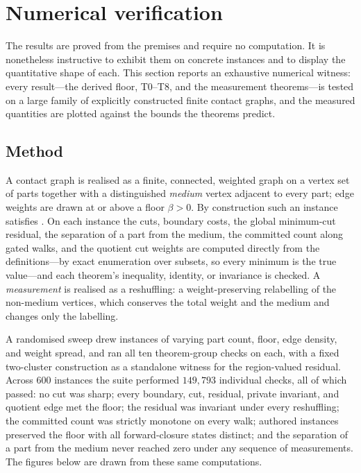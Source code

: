 \documentclass[11pt,a4paper]{article}
\theoremstyle{thmstyle}
\theoremstyle{definition}
\theoremstyle{remark}
\newcommand{\floorc}{\beta}               %
\begin{document}
\section{Numerical verification}
\label{sec:validation}

The results are proved from the premises and require no computation. It is
nonetheless instructive to exhibit them on concrete instances and to display the
quantitative shape of each. This section reports an exhaustive numerical witness:
every result---the derived floor, T0--T8, and the measurement theorems---is tested
on a large family of explicitly constructed finite contact graphs, and the
measured quantities are plotted against the bounds the theorems predict.

\subsection{Method}

A contact graph is realised as a finite, connected, weighted graph on a vertex
set of parts together with a distinguished \emph{medium} vertex adjacent to every
part; edge weights are drawn at or above a floor $\floorc>0$. By construction such
an instance satisfies . On each instance the cuts, boundary
costs, the global minimum-cut residual, the separation of a part from the medium,
the committed count along gated walks, and the quotient cut weights are computed
directly from the definitions---by exact enumeration over subsets, so every
minimum is the true value---and each theorem's inequality, identity, or invariance
is checked. A \emph{measurement} is realised as a reshuffling: a weight-preserving
relabelling of the non-medium vertices, which conserves the total weight and the
medium and changes only the labelling.

A randomised sweep drew instances of varying part count, floor, edge density, and
weight spread, and ran all ten theorem-group checks on each, with a fixed
two-cluster construction as a standalone witness for the region-valued residual.
Across $600$ instances the suite performed $149{,}793$ individual checks, all of
which passed: no cut was sharp; every boundary, cut, residual, private invariant,
and quotient edge met the floor; the residual was invariant under every
reshuffling; the committed count was strictly monotone on every walk;
authored instances preserved the floor with all forward-closure states distinct;
and the separation of a part from the medium never reached zero under any sequence
of measurements. The figures below are drawn from these same computations.
\end{document}
